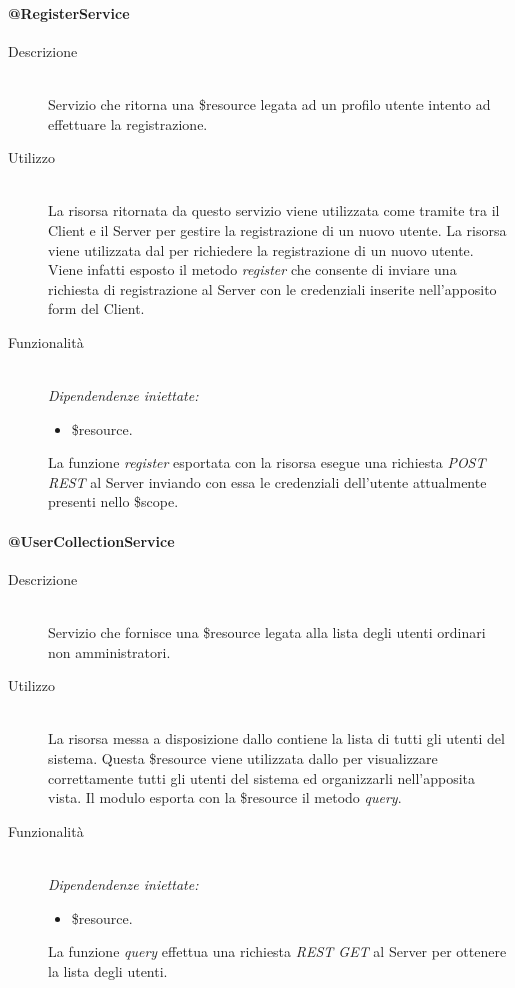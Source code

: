 \paragraph{@RegisterService}
\begin{description}
 \item[Descrizione] \hfill \\
 Servizio che ritorna una \$resource legata ad un profilo utente intento ad effettuare la registrazione. 
 \item[Utilizzo] \hfill \\
 La risorsa ritornata da questo servizio viene utilizzata come tramite tra il Client e il Server per gestire la registrazione di un nuovo utente. 
 La risorsa viene utilizzata dal  per richiedere la registrazione di un nuovo utente. Viene infatti esposto il metodo \textit{register} 
 che consente di inviare una richiesta di registrazione al Server con le credenziali inserite nell'apposito form del Client. 
 \item[Funzionalità] \hfill \\
 \emph{Dipendendenze iniettate:}
 \begin{itemize}
  \item \$resource.
 \end{itemize}
 La funzione \textit{register} esportata con la risorsa esegue una richiesta \textit{POST REST} al Server inviando con essa le credenziali dell'utente 
 attualmente presenti nello \$scope.
\end{description}

\paragraph{@UserCollectionService}
\begin{description}
 \item[Descrizione] \hfill \\
 Servizio che fornisce una \$resource legata alla lista degli utenti ordinari non amministratori.  
 \item[Utilizzo] \hfill \\
 La risorsa messa a disposizione dallo  contiene la lista di tutti gli utenti 
 del sistema. Questa \$resource viene utilizzata dallo  per visualizzare 
 correttamente tutti gli utenti del sistema ed organizzarli nell'apposita vista. Il modulo esporta 
 con la \$resource il metodo \textit{query}. 
 \item[Funzionalità] \hfill \\
 \emph{Dipendendenze iniettate:}
 \begin{itemize}
  \item \$resource.
 \end{itemize}
 La funzione \textit{query} effettua una richiesta \textit{REST GET} al Server per ottenere la lista degli 
 utenti.
\end{description}

